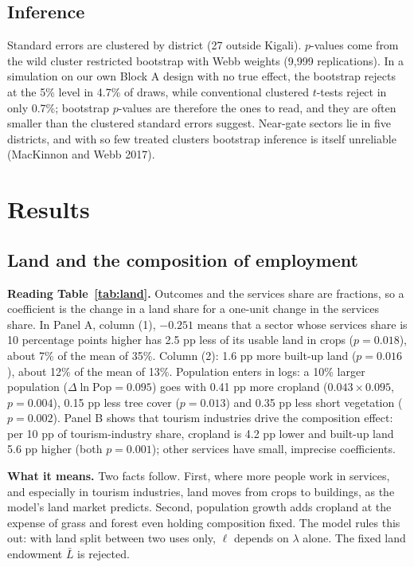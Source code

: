 \documentclass[11pt]{article}
\begin{document}
\subsection{Inference}
Standard errors are clustered by district (27 outside Kigali). $p$-values come from the wild cluster restricted bootstrap with Webb weights (9,999 replications). In a simulation on our own Block A design with no true effect, the bootstrap rejects at the 5\% level in 4.7\% of draws, while conventional clustered $t$-tests reject in only 0.7\%; bootstrap $p$-values are therefore the ones to read, and they are often smaller than the clustered standard errors suggest. Near-gate sectors lie in five districts, and with so few treated clusters bootstrap inference is itself unreliable (MacKinnon and Webb 2017).

\section{Results}

\subsection{Land and the composition of employment}


\noindent\textbf{Reading Table~\ref{tab:land}.} Outcomes and the services share are fractions, so a coefficient is the change in a land share for a one-unit change in the services share. In Panel A, column (1), $-0.251$ means that a sector whose services share is 10 percentage points higher has 2.5 pp less of its usable land in crops ($p=0.018$), about 7\% of the mean of 35\%. Column (2): 1.6 pp more built-up land ($p=0.016$), about 12\% of the mean of 13\%. Population enters in logs: a 10\% larger population ($\Delta\ln\text{Pop}=0.095$) goes with 0.41 pp more cropland ($0.043\times0.095$, $p=0.004$), 0.15 pp less tree cover ($p=0.013$) and 0.35 pp less short vegetation ($p=0.002$). Panel B shows that tourism industries drive the composition effect: per 10 pp of tourism-industry share, cropland is 4.2 pp lower and built-up land 5.6 pp higher (both $p=0.001$); other services have small, imprecise coefficients.

\medskip\noindent\textbf{What it means.} Two facts follow. First, where more people work in services, and especially in tourism industries, land moves from crops to buildings, as the model's land market predicts. Second, population growth adds cropland at the expense of grass and forest even holding composition fixed. The model rules this out: with land split between two uses only, $\ell$ depends on $\lambda$ alone. The fixed land endowment $\bar L$ is rejected.
\end{document}
